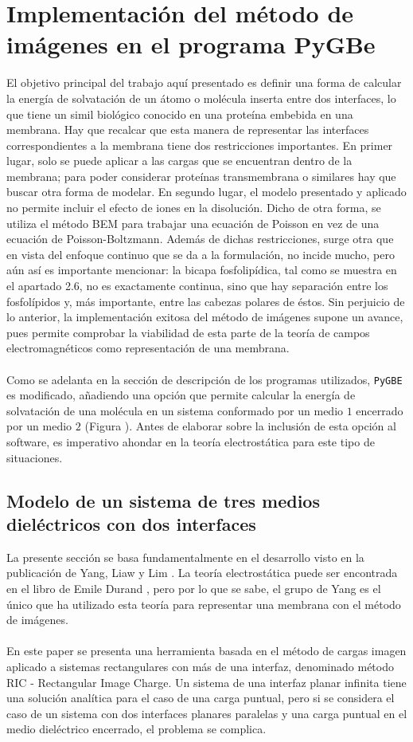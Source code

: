 \documentclass[12pt, oneside, numbers, spanish]{ezthesis}
\numberwithin{equation}{section}
\begin{document}
\section{Implementación del método de imágenes en el programa PyGBe}\label{Sec:Implementation}
El objetivo principal del trabajo aquí presentado es definir una forma de calcular la energía de solvatación de un átomo o molécula inserta entre dos interfaces, lo que tiene un simil biológico conocido en una proteína embebida en una membrana. Hay que recalcar que esta manera de representar las interfaces correspondientes a la membrana tiene dos restricciones importantes. En primer lugar, solo se puede aplicar a las cargas que se encuentran dentro de la membrana; para poder considerar proteínas transmembrana o similares hay que buscar otra forma de modelar. En segundo lugar, el modelo presentado y aplicado no permite incluir el efecto de iones en la disolución. Dicho de otra forma, se utiliza el método BEM para trabajar una ecuación de Poisson en vez de una ecuación de Poisson-Boltzmann. Además de dichas restricciones, surge otra que en vista del enfoque continuo que se da a la formulación, no incide mucho, pero aún así es importante mencionar: la bicapa fosfolipídica, tal como se muestra en el apartado 2.6, no es exactamente continua, sino que hay separación entre los fosfolípidos y, más importante, entre las cabezas polares de éstos. Sin perjuicio de lo anterior, la implementación exitosa del método de imágenes supone un avance, pues permite comprobar la viabilidad de esta parte de la teoría de campos electromagnéticos como representación de una membrana.\\\\
Como se adelanta en la sección de descripción de los programas utilizados, \texttt{PyGBE} es modificado, añadiendo una opción que permite calcular la energía de solvatación de una molécula en un sistema conformado por un medio $1$ encerrado por un medio $2$ (Figura ). Antes de elaborar sobre la inclusión de esta opción al software, es imperativo ahondar en la teoría electrostática para este tipo de situaciones.

\subsection{Modelo de un sistema de tres medios dieléctricos con dos interfaces}\label{subsec:2_Inter_Images}
La presente sección se basa fundamentalmente en el desarrollo visto en la publicación de Yang, Liaw y Lim \cite{Pei-kun}. La teoría electrostática puede ser encontrada en el libro de Emile Durand \cite{Durand}, pero por lo que se sabe, el grupo de Yang es el único que ha utilizado esta teoría para representar una membrana con el método de imágenes.\\\\
En este paper se presenta una herramienta basada en el método de cargas imagen aplicado a sistemas rectangulares con más de una interfaz, denominado método RIC - Rectangular Image Charge. Un sistema de una interfaz planar infinita tiene una solución analítica para el caso de una carga puntual, pero si se considera el caso de un sistema con dos interfaces planares paralelas y una carga puntual en el medio dieléctrico encerrado, el problema se complica.
\end{document}

